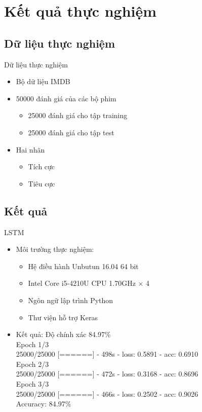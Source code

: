\documentclass[compress]{beamer}
\begin{document}
\section{Kết quả thực nghiệm}
\subsection{Dữ liệu thực nghiệm}
\begin{frame}{Dữ liệu thực nghiệm}
\begin{itemize}
\item Bộ dữ liệu IMDB
\item 50000 đánh giá của các bộ phim
\begin{itemize}
\item 25000 đánh giá cho tập training
\item 25000 đánh giá cho tập test 
\end{itemize}
\item Hai nhãn
\begin{itemize}
\item Tích cực
\item Tiêu cực
\end{itemize}
\end{itemize}
\end{frame}

\subsection{Kết quả}
\begin{frame}{LSTM}
\begin{itemize}
\item Môi trường thực nghiệm:
\begin{itemize}
\item Hệ điều hành Unbutun 16.04 64 bit
\item Intel Core i5-4210U CPU 1.70GHz $\times$ 4
\item Ngôn ngữ lập trình Python
\item Thư viện hỗ trợ Keras
\end{itemize}
\item Kết quả: Độ chính xác 84.97\%
\\[0.3cm]{\small
Epoch 1/3\\
25000/25000 [======] - 498s - loss: 0.5891 - acc: 0.6910\\
Epoch 2/3\\
25000/25000 [======] - 472s - loss: 0.3168 - acc: 0.8696\\   
Epoch 3/3\\
25000/25000 [======] - 466s - loss: 0.2502 - acc: 0.9026\\[0.3cm]
Accuracy: 84.97\% \\
}
\end{itemize}
\end{frame}
\end{document}
